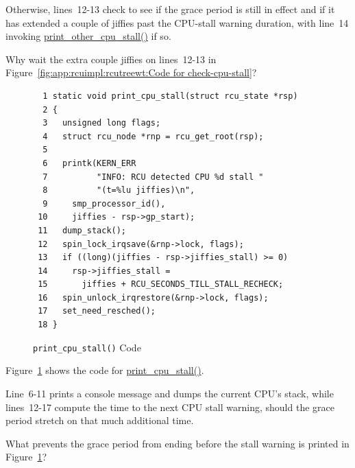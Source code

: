 Otherwise, lines~12-13 check to see if the grace period is still in effect
and if it has extended a couple of jiffies past the CPU-stall warning
duration, with line~14 invoking \url{print_other_cpu_stall()} if so.

\QuickQuiz{}
	Why wait the extra couple jiffies on lines~12-13 in
	Figure~\ref{fig:app:rcuimpl:rcutreewt:Code for check-cpu-stall}?
 \QuickQuizEnd

\begin{figure}[tbp]
{ \scriptsize
\begin{verbatim}
  1 static void print_cpu_stall(struct rcu_state *rsp)
  2 {
  3   unsigned long flags;
  4   struct rcu_node *rnp = rcu_get_root(rsp);
  5
  6   printk(KERN_ERR
  7          "INFO: RCU detected CPU %d stall "
  8          "(t=%lu jiffies)\n",
  9     smp_processor_id(),
 10     jiffies - rsp->gp_start);
 11   dump_stack();
 12   spin_lock_irqsave(&rnp->lock, flags);
 13   if ((long)(jiffies - rsp->jiffies_stall) >= 0)
 14     rsp->jiffies_stall =
 15       jiffies + RCU_SECONDS_TILL_STALL_RECHECK;
 16   spin_unlock_irqrestore(&rnp->lock, flags);
 17   set_need_resched();
 18 }
\end{verbatim}
}
\caption{{\tt print\_cpu\_stall()} Code}
\label{fig:app:rcuimpl:rcutreewt:Code for print-cpu-stall}
\end{figure}

Figure~\ref{fig:app:rcuimpl:rcutreewt:Code for print-cpu-stall}
shows the code for \url{print_cpu_stall()}.

Line~6-11 prints a console message and dumps the current CPU's stack,
while lines~12-17 compute the time to the next CPU stall warning, should
the grace period stretch on that much additional time.

\QuickQuiz{}
	What prevents the grace period from ending before the
	stall warning is printed in
	Figure~\ref{fig:app:rcuimpl:rcutreewt:Code for print-cpu-stall}?
 \QuickQuizEnd

